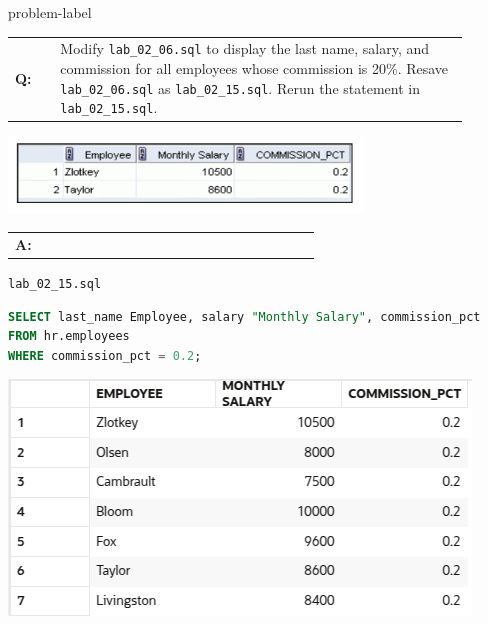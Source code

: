 \begin{problem}{}{problem-label}

\begin{tabular}{@{}l p{0.9\linewidth}@{}}
  \textbf{Q:} & Modify \texttt{lab\_02\_06.sql} to display the last name, salary, and commission for all employees
whose commission is 20\%. Resave \texttt{lab\_02\_06.sql} as \texttt{lab\_02\_15.sql}. Rerun the statement in \texttt{lab\_02\_15.sql}.
\end{tabular}

\begin{center}
  \includegraphics[scale=0.8]{images/c2q15.png}
\end{center}

\newpage

\begin{tabular}{@{}l p{0.9\linewidth}@{}}
  \textbf{A:} & 
\end{tabular}

\hspace{1.5em}\texttt{lab\_02\_15.sql}
\begin{lstlisting}[language=SQL]
SELECT last_name Employee, salary "Monthly Salary", commission_pct
FROM hr.employees
WHERE commission_pct = 0.2;
\end{lstlisting}

\vspace{1em}

\begin{center}
  \includegraphics[scale=0.8]{images/c2a15.png}
\end{center}

\end{problem}


